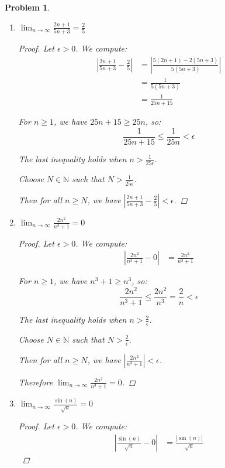 \documentclass[12pt]{article}
\newtheorem{problem}{Problem}
\newcommand{\eps}{\ensuremath{\epsilon}}
\begin{document}
\begin{problem} %
\begin{enumerate}
\item $\displaystyle \lim_{n\to\infty} \frac{2n+1}{5n+3} = \frac{2}{5}$

\begin{proof}
Let $\eps>0$. We compute:
\begin{align*}
\left|\frac{2n+1}{5n+3} - \frac{2}{5}\right| &= \left|\frac{5(2n+1) - 2(5n+3)}{5(5n+3)}\right| \\
&= \frac{1}{5(5n+3)} \\
&= \frac{1}{25n+15}
\end{align*}

For $n \geq 1$, we have $25n + 15 \geq 25n$, so:
$$\frac{1}{25n+15} \leq \frac{1}{25n} < \eps$$

The last inequality holds when $n > \frac{1}{25\eps}$.

Choose $N \in \mathbb{N}$ such that $N > \frac{1}{25\eps}$.

Then for all $n \geq N$, we have $\left|\frac{2n+1}{5n+3} - \frac{2}{5}\right| < \eps$.
\end{proof}

\item $\displaystyle \lim_{n\to\infty} \frac{2n^2}{n^3 + 1} = 0$

\begin{proof}
Let $\eps>0$. We compute:
\begin{align*}
\left|\frac{2n^2}{n^3+1} - 0\right| &= \frac{2n^2}{n^3+1}
\end{align*}

For $n \geq 1$, we have $n^3 + 1 \geq n^3$, so:
$$\frac{2n^2}{n^3+1} \leq \frac{2n^2}{n^3} = \frac{2}{n} < \eps$$

The last inequality holds when $n > \frac{2}{\eps}$.

Choose $N \in \mathbb{N}$ such that $N > \frac{2}{\eps}$.

Then for all $n \geq N$, we have $\left|\frac{2n^2}{n^3+1}\right| < \eps$.

Therefore $\displaystyle \lim_{n\to\infty} \frac{2n^2}{n^3 + 1} = 0$.
\end{proof}

\item $\displaystyle \lim_{n\to\infty} \frac{\sin(n)}{\sqrt{n}} = 0$

\begin{proof}
Let $\eps>0$. We compute:
\begin{align*}
\left|\frac{\sin(n)}{\sqrt{n}} - 0\right| &= \frac{|\sin(n)|}{\sqrt{n}}
\end{align*}


\end{proof}
\end{enumerate}
\end{problem}
\end{document}
